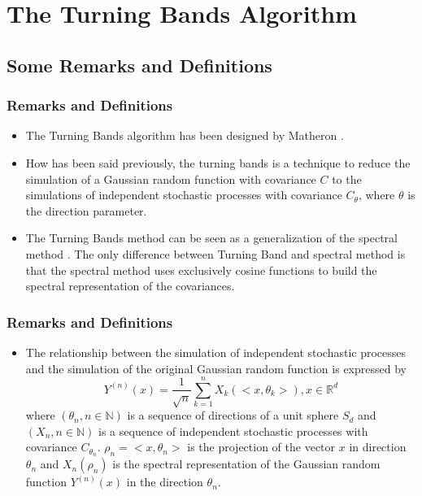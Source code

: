 \documentclass{beamer}
\begin{document}
\section{The Turning Bands Algorithm}
\subsection{Some Remarks and Definitions}

\begin{frame}
\frametitle{Remarks and Definitions}
\begin{itemize}
 \item The Turning Bands algorithm has been designed by Matheron \cite{m1973}.
 \item How has been said previously, the turning bands is a technique to reduce the simulation 
 of a Gaussian random function with covariance $C$ 
 to the simulations of independent stochastic processes with covariance $C_\theta$, where $\theta$ is the direction parameter.
 \item The Turning Bands method can be seen as a generalization of the spectral method \cite{l2002}. The only difference between
 Turning Band and spectral method is that the spectral method uses exclusively cosine functions to build the spectral representation 
 of the covariances.
\end{itemize}
\end{frame}

\begin{frame}
\frametitle{Remarks and Definitions}
\begin{itemize}
 \item The relationship between the simulation of independent stochastic processes and the simulation 
 of the original Gaussian random function 
 is expressed by 
 \begin{equation}
  Y^{(n)}(x) = \frac{1}{\sqrt{n}} \sum_{k=1}^{n} X_k(<x,\theta_k>), x \in \mathbb{R}^d
 \end{equation}
 where $(\theta_n, n \in \mathbb{N})$ is a sequence of directions of a unit sphere $S_d$ and $(X_n, n \in \mathbb{N})$ is a sequence of
 independent stochastic processes with covariance $C_{\theta_n}$. $\rho_n = <x, \theta_n>$ is the projection of the vector
 $x$ in direction $\theta_n$ and $X_n(\rho_n)$ is the spectral representation of the Gaussian random function $Y^{(n)}(x)$ in
 the direction $\theta_n$.
\end{itemize}
\end{frame}
\end{document}
